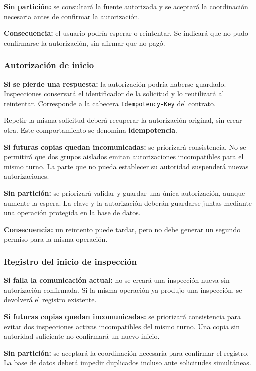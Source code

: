 \documentclass[11pt,a4paper]{article}
\begin{document}
	\textbf{Sin partición:} se consultará la fuente autorizada y se aceptará la coordinación necesaria antes de confirmar la autorización.
	
	\textbf{Consecuencia:} el usuario podría esperar o reintentar. Se indicará que no pudo confirmarse la autorización, sin afirmar que no pagó.
	
	\subsubsection{Autorización de inicio}
	
	\textbf{Si se pierde una respuesta:} la autorización podría haberse guardado. Inspecciones conservará el identificador de la solicitud y lo reutilizará al reintentar. Corresponde a la cabecera \texttt{Idempotency-Key} del contrato.
	
	Repetir la misma solicitud deberá recuperar la autorización original, sin crear otra. Este comportamiento se denomina \textbf{idempotencia}.
	
	\textbf{Si futuras copias quedan incomunicadas:} se priorizará consistencia. No se permitirá que dos grupos aislados emitan autorizaciones incompatibles para el mismo turno. La parte que no pueda establecer su autoridad suspenderá nuevas autorizaciones.
	
	\textbf{Sin partición:} se priorizará validar y guardar una única autorización, aunque aumente la espera. La clave y la autorización deberán guardarse juntas mediante una operación protegida en la base de datos.
	
	\textbf{Consecuencia:} un reintento puede tardar, pero no debe generar un segundo permiso para la misma operación.
	
	\subsubsection{Registro del inicio de inspección}
	
	\textbf{Si falla la comunicación actual:} no se creará una inspección nueva sin autorización confirmada. Si la misma operación ya produjo una inspección, se devolverá el registro existente.
	
	\textbf{Si futuras copias quedan incomunicadas:} se priorizará consistencia para evitar dos inspecciones activas incompatibles del mismo turno. Una copia sin autoridad suficiente no confirmará un nuevo inicio.
	
	\textbf{Sin partición:} se aceptará la coordinación necesaria para confirmar el registro. La base de datos deberá impedir duplicados incluso ante solicitudes simultáneas.
	
\end{document}

